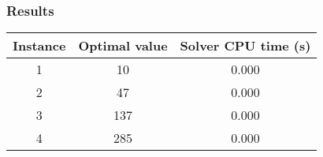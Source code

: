 \subsubsection*{Results}

\begin{table}[h!]
	\centering
	\begin{tabular}{|c|c|c|}
		\hline
		\textbf{Instance} & \textbf{Optimal value} & \textbf{Solver CPU time (s)} \\
		\hline
		1 & 10  & 0.000 \\
		\hline
		2 & 47 & 0.000 \\
		\hline
		3 & 137 & 0.000 \\
		\hline
		4 & 285 & 0.000 \\
		\hline
	\end{tabular}
	\label{tab:instance_costs}
\end{table}